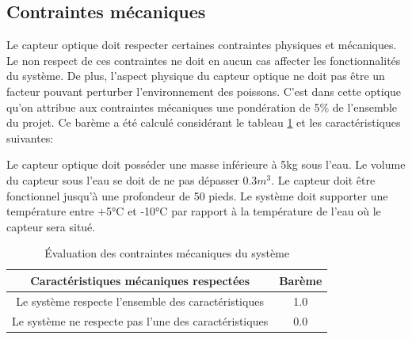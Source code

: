 \subsection{Contraintes mécaniques}

Le capteur optique doit respecter certaines contraintes physiques et mécaniques. Le non respect de ces contraintes ne doit en aucun cas affecter les fonctionnalités du système. De plus, l'aspect physique du capteur optique ne doit pas être un facteur pouvant perturber l'environnement des poissons. C'est dans cette optique qu'on attribue aux contraintes mécaniques une pondération de 5\% de l'ensemble du projet. Ce barème a été calculé considérant le tableau \ref{t:bareme_contraintes_mecaniques} et les caractéristiques suivantes:

Le capteur optique doit posséder une masse inférieure à 5kg sous l'eau. Le volume du capteur sous l'eau se doit de ne pas dépasser 0.3$m^{3}$. Le capteur doit être fonctionnel jusqu'à une profondeur de 50 pieds. Le système doit supporter une température entre +5°C et -10°C par rapport à la température de l'eau où le capteur sera situé.


\begin{table}[htb!]
   \footnotesize
   \centering
   \begin{tabular}{|c|c|}
        \hline
        Caractéristiques mécaniques respectées & Barème\\
        \hline
        \hline
        Le système respecte l'ensemble des caractéristiques & 1.0 \\
        \hline
        Le système ne respecte pas l'une des caractéristiques & 0.0 \\
        \hline
   \end{tabular}
   \caption{Évaluation des contraintes mécaniques du système}
   \label{t:bareme_contraintes_mecaniques}
\end{table}

